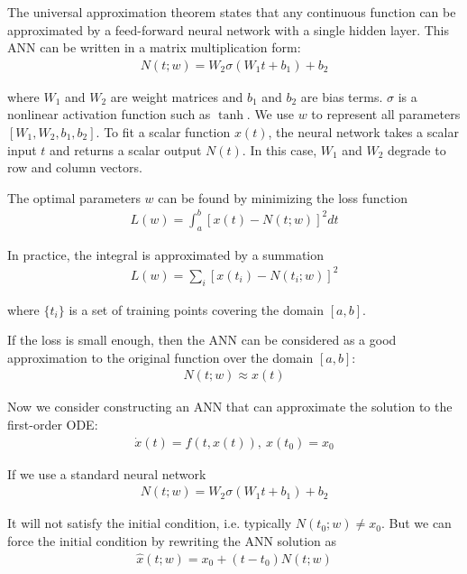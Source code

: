 \documentclass[a4paper]{article}
\numberwithin{equation}{section}
\begin{document}
The universal approximation theorem\cite{hornik89feedforward} states that any continuous function can be approximated by a feed-forward neural network with a single hidden layer. This ANN can be written in a matrix multiplication form:
\begin{align*}
  N(t; w) = W_2 \sigma (W_1 t + b_1) + b_2
\end{align*}

where \( W_1 \) and \( W_2 \) are weight matrices and \( b_1 \) and \( b_2 \) are bias terms. \( \sigma \) is a nonlinear activation function such as \( \tanh \). We use \( w \) to represent all parameters \( [W_1, W_2, b_1, b_2] \). To fit a scalar function \( x(t) \), the neural network takes a scalar input \( t \) and returns a scalar output \( N(t) \). In this case, \( W_1 \) and \( W_2 \) degrade to row and column vectors.

The optimal parameters \( w \) can be found by minimizing the loss function
\begin{align*}
  L(w) = \int_a^b {[x(t) - N(t; w)]}^2 dt
\end{align*}

In practice, the integral is approximated by a summation
\begin{align*}
  L(w) = \sum_i {[x(t_i) - N(t_i; w)]}^2
\end{align*}

where \( \{t_i\} \) is a set of training points covering the domain \( [a, b] \).

If the loss is small enough, then the ANN can be considered as a good approximation to the original function over the domain \( [a, b] \):
\begin{align*}
  N(t; w) \approx x(t)
\end{align*}

Now we consider constructing an ANN that can approximate the solution to the first-order ODE:
\begin{align*}
  \dot{x}(t) = f(t, x(t)),\ x(t_0) = x_0
\end{align*}

If we use a standard neural network
\begin{align*}
  N(t; w) = W_2\sigma(W_1t + b_1) + b_2
\end{align*}

It will not satisfy the initial condition, i.e. typically \( N(t_0; w) \neq x_0 \).  But we can force the initial condition by rewriting the ANN solution as
\begin{align*}
  \hat{x}(t; w) = x_0 + (t - t_0)N(t; w)
\end{align*}
\end{document}
